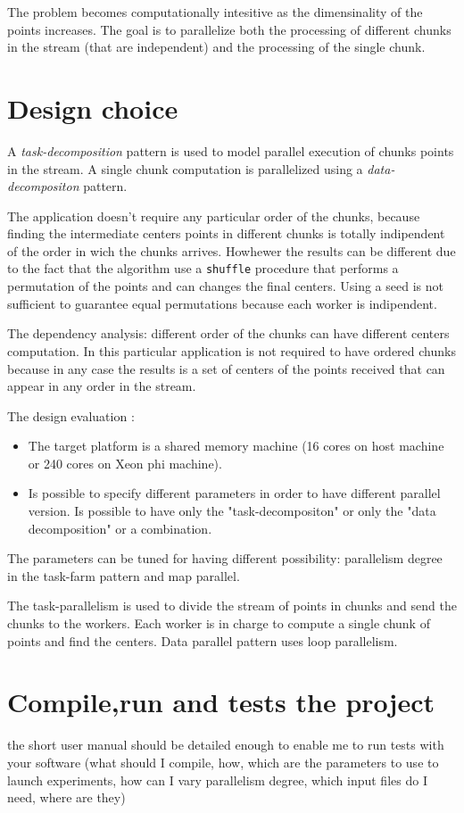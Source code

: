 \documentclass[12pt]{article}
\begin{document}
The problem becomes computationally intesitive as the dimensinality of the points increases.
The goal is to parallelize both the processing of different chunks in the stream (that are independent) and the processing of the single chunk. 

\section{Design choice}
A \emph{task-decomposition} pattern is used to model parallel execution of chunks points in the stream. A single chunk computation is parallelized using a \emph{data-decompositon} pattern.

The application doesn't require any particular order of the chunks, because finding the intermediate centers points in different chunks is totally indipendent of the order in wich the chunks arrives. 
Howhewer the results can be different due to the fact that the algorithm use a \texttt{shuffle} procedure that performs a permutation of the points and can changes the final centers. Using a seed is not sufficient to guarantee  equal permutations because each worker is indipendent.


The dependency analysis: different order of the chunks can have different centers computation. In this particular application is not required to have ordered chunks because in any case the results is a set of centers of the points received that can appear in any order in the stream.

The design evaluation :
\begin{itemize}
\item The target platform is a shared memory machine (16 cores on host machine or 240 cores on Xeon phi machine).
\item Is possible to specify different parameters in order to have different parallel version. Is possible to have only the "task-decompositon" or only the "data decomposition" or a combination.
\end{itemize}

The parameters can be tuned for having different possibility:  parallelism degree in the task-farm pattern and map parallel. 

The task-parallelism is used to divide the stream of points in chunks and send the chunks to the workers. 
Each worker is in charge to compute a single chunk of points and find the centers.
Data parallel pattern uses loop parallelism.




\section{Compile,run and tests the project}
the short user manual should be detailed enough to enable me to run tests with your software (what should I compile, how, which are the parameters to use to launch experiments, how can I vary parallelism degree, which input files do I need, where are they)
\end{document}
